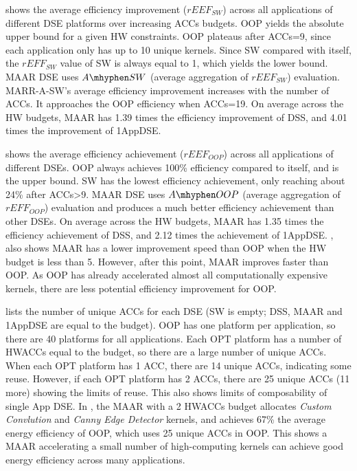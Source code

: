  shows the average efficiency improvement ($rEEF_{SW}$) across all applications of different DSE platforms over increasing ACCs budgets. OOP yields the absolute upper bound for a given HW constraints. OOP plateaus after ACCs=9, since each application only has up to 10 unique kernels. Since SW compared with itself, the $rEFF_{SW}$ value of SW is always equal to 1, which yields the lower bound. MAAR DSE uses $A\mhyphen SW$ (average aggregation of $rEEF_{SW}$) evaluation. MARR-A-SW's average efficiency improvement increases with the number of ACCs. It approaches the OOP efficiency when ACCs=19. On average across the HW budgets, MAAR has 1.39 times the efficiency improvement of DSS, and 4.01 times the improvement of 1AppDSE.

 shows the average efficiency achievement ($rEEF_{OOP}$) across all applications of different DSEs. OOP always achieves 100\% efficiency compared to itself, and is the upper bound. SW has the lowest efficiency achievement, only reaching about 24\% after ACCs>9. MAAR DSE uses $A\mhyphen OOP$ (average aggregation of $rEFF_{OOP}$) evaluation and produces a much better efficiency achievement than other DSEs. On average across the HW budgets, MAAR has 1.35 times the efficiency achievement of DSS, and 2.12 times the achievement of 1AppDSE. , also shows MAAR has a lower improvement speed than OOP when the HW budget is less than 5. However, after this point, MAAR improves faster than OOP. As OOP has already accelerated almost all computationally expensive kernels, there are less potential efficiency improvement for OOP.  


 lists the number of unique ACCs for each DSE (SW is empty; DSS, MAAR and 1AppDSE are equal to the budget). OOP has one platform per application, so there are 40 platforms for all applications. Each OPT platform has a number of HWACCs equal to the budget, so there are a large number of unique ACCs. When each OPT platform has 1 ACC, there are 14 unique ACCs, indicating some reuse. However, if each OPT platform has 2 ACCs, there are 25 unique ACCs (11 more) showing the limits of reuse. This also shows limits of composability of single App DSE. In , the MAAR with a 2 HWACCs budget allocates \emph{Custom Convlution} and \emph{Canny Edge Detector} kernels, and achieves 67\% the average energy efficiency of OOP, which uses 25 unique ACCs in OOP. This shows a MAAR accelerating a small number of high-computing kernels can achieve good energy efficiency across many applications.

